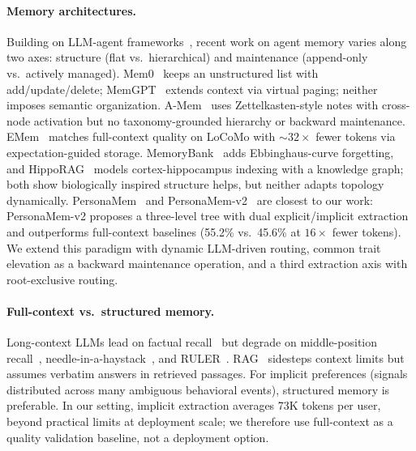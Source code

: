 \documentclass[sigconf,review,anonymous]{acmart}
\begin{document}
\paragraph{Memory architectures.}
Building on LLM-agent frameworks~\cite{react,reflexion,generative-agents}, recent work on agent memory varies along two axes: structure (flat vs.\ hierarchical) and maintenance (append-only vs.\ actively managed). Mem0~\cite{mem0} keeps an unstructured list with add/update/delete; MemGPT~\cite{memgpt} extends context via virtual paging; neither imposes semantic organization. A-Mem~\cite{amem} uses Zettelkasten-style notes with cross-node activation but no taxonomy-grounded hierarchy or backward maintenance. EMem~\cite{emem} matches full-context quality on LoCoMo with ${\sim}32\times$ fewer tokens via expectation-guided storage. MemoryBank~\cite{memorybank} adds Ebbinghaus-curve forgetting, and HippoRAG~\cite{hipporag} models cortex-hippocampus indexing with a knowledge graph; both show biologically inspired structure helps, but neither adapts topology dynamically. PersonaMem~\cite{personamem} and PersonaMem-v2~\cite{personamem-v2} are closest to our work: PersonaMem-v2 proposes a three-level tree with dual explicit/implicit extraction and outperforms full-context baselines (55.2\% vs.\ 45.6\% at \(16\times\) fewer tokens). We extend this paradigm with dynamic LLM-driven routing, common trait elevation as a backward maintenance operation, and a third extraction axis with root-exclusive routing.

\paragraph{Full-context vs.\ structured memory.}
Long-context LLMs lead on factual recall~\cite{beyond-context-window} but degrade on middle-position recall~\cite{lost-in-the-middle}, needle-in-a-haystack~\cite{needle-haystack}, and RULER~\cite{ruler}. RAG~\cite{rag,self-rag} sidesteps context limits but assumes verbatim answers in retrieved passages. For implicit preferences (signals distributed across many ambiguous behavioral events), structured memory is preferable. In our setting, implicit extraction averages 73K tokens per user, beyond practical limits at deployment scale; we therefore use full-context as a quality validation baseline, not a deployment option.
\end{document}
